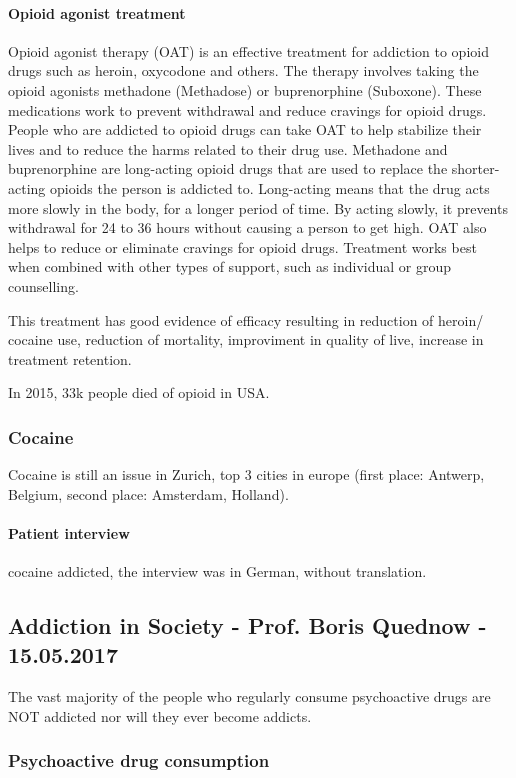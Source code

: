\documentclass[12pt,article,oneside,a4paper]{memoir}
\begin{document}
\paragraph{Opioid agonist treatment}
Opioid agonist therapy (OAT) is an effective treatment for addiction to opioid
drugs such as heroin, oxycodone and others. The therapy involves taking the
opioid agonists methadone (Methadose) or buprenorphine (Suboxone). These
medications work to prevent withdrawal and reduce cravings for opioid drugs.
People who are addicted to opioid drugs can take OAT to help stabilize their
lives and to reduce the harms related to their drug use.
Methadone and buprenorphine are long-acting opioid drugs that are used to
replace the shorter-acting opioids the person is addicted to. Long-acting means
that the drug acts more slowly in the body, for a longer period of time. By
acting slowly, it prevents withdrawal for 24 to 36 hours without causing a
person to get high. OAT also helps to reduce or eliminate cravings for opioid
drugs. Treatment works best when combined with other types of support, such as
individual or group counselling. 

This treatment has good evidence of efficacy resulting in reduction of heroin/
cocaine use, reduction of mortality, improviment in quality of live, increase
in treatment retention.

In 2015, 33k people died of opioid in USA.

\subsubsection{Cocaine}
Cocaine is still an issue in Zurich, top 3 cities in europe
(first place: Antwerp, Belgium, second place: Amsterdam, Holland).

\paragraph{Patient interview} cocaine addicted, the interview was in German,
without translation.

\subsection{Addiction in Society - Prof. Boris Quednow - 15.05.2017}

The vast majority of the people who regularly consume psychoactive drugs are
NOT addicted nor will they ever become addicts.

\subsubsection{Psychoactive drug consumption}
\end{document}

